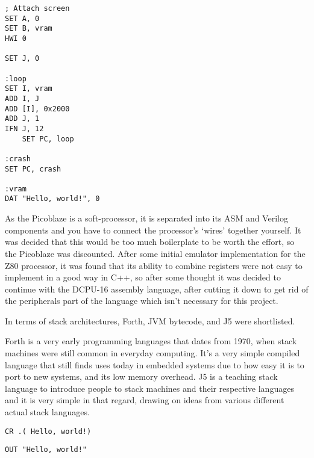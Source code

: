 \noindent\begin{minipage}{\linewidth} %
\begin{lstlisting}[caption={DCPU-16 ASM}]
; Attach screen
SET A, 0
SET B, vram
HWI 0

SET J, 0

:loop
SET I, vram
ADD I, J
ADD [I], 0x2000
ADD J, 1
IFN J, 12
    SET PC, loop

:crash
SET PC, crash

:vram
DAT "Hello, world!", 0
\end{lstlisting}%
\end{minipage}

As the Picoblaze is a soft-processor, it is separated into its ASM and Verilog
components and you have to connect the processor's `wires' together yourself. It
was decided that this would be too much boilerplate to be worth the effort, so
the Picoblaze was discounted. After some initial emulator implementation for the
Z80 processor, it was found that its ability to combine registers were not easy
to implement in a good way in C++, so after some thought it was decided to
continue with the DCPU-16 assembly language, after cutting it down to get rid of
the peripherals part of the language which isn't necessary for this project.

In terms of stack architectures, Forth, JVM bytecode, and J5 were shortlisted.

Forth is a very early programming languages that dates from 1970, when stack
machines were still common in everyday computing. It's a very simple compiled
language that still finds uses today in embedded systems due to how easy it is
to port to new systems, and its low memory overhead. J5 is a teaching stack
language to introduce people to stack machines and their respective languages
and it is very simple in that regard, drawing on ideas from various different
actual stack languages.

\noindent\begin{minipage}{0.5\textwidth}
\begin{lstlisting}[caption={Forth ASM}]
CR .( Hello, world!)
\end{lstlisting}
\end{minipage}%
\noindent\begin{minipage}{0.5\textwidth}
\begin{lstlisting}[caption={J5 ASM}]
OUT "Hello, world!"
\end{lstlisting}
\end{minipage}

